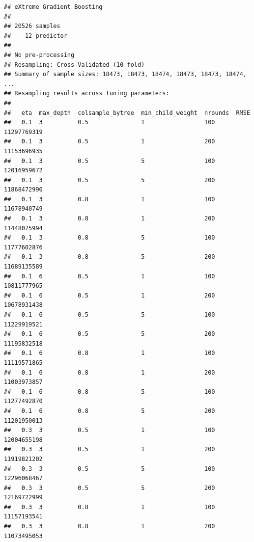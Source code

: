 \documentclass[11pt,]{article}
\newenvironment{Shaded}{\begin{snugshade}}{\end{snugshade}}
\newcommand{\KeywordTok}[1]{\textcolor[rgb]{0.13,0.29,0.53}{\textbf{#1}}}
\newcommand{\NormalTok}[1]{#1}
\newcommand{\OperatorTok}[1]{\textcolor[rgb]{0.81,0.36,0.00}{\textbf{#1}}}
\newcommand{\StringTok}[1]{\textcolor[rgb]{0.31,0.60,0.02}{#1}}
\begin{document}
\begin{Shaded}
\end{Shaded}

\begin{verbatim}
## eXtreme Gradient Boosting 
## 
## 20526 samples
##    12 predictor
## 
## No pre-processing
## Resampling: Cross-Validated (10 fold) 
## Summary of sample sizes: 18473, 18473, 18474, 18473, 18473, 18474, ... 
## Resampling results across tuning parameters:
## 
##   eta  max_depth  colsample_bytree  min_child_weight  nrounds  RMSE       
##   0.1  3          0.5               1                 100      11297769319
##   0.1  3          0.5               1                 200      11153696935
##   0.1  3          0.5               5                 100      12016959672
##   0.1  3          0.5               5                 200      11868472990
##   0.1  3          0.8               1                 100      11678940749
##   0.1  3          0.8               1                 200      11448075994
##   0.1  3          0.8               5                 100      11777602876
##   0.1  3          0.8               5                 200      11689135589
##   0.1  6          0.5               1                 100      10811777965
##   0.1  6          0.5               1                 200      10678931438
##   0.1  6          0.5               5                 100      11229919521
##   0.1  6          0.5               5                 200      11195832518
##   0.1  6          0.8               1                 100      11119571865
##   0.1  6          0.8               1                 200      11003973857
##   0.1  6          0.8               5                 100      11277492870
##   0.1  6          0.8               5                 200      11201950013
##   0.3  3          0.5               1                 100      12004655198
##   0.3  3          0.5               1                 200      11919821202
##   0.3  3          0.5               5                 100      12296068467
##   0.3  3          0.5               5                 200      12169722999
##   0.3  3          0.8               1                 100      11157193541
##   0.3  3          0.8               1                 200      11073495053

\end{verbatim}
\end{document}
